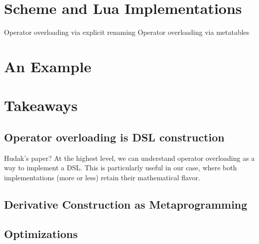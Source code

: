 \documentclass{article}
\begin{document}
\section{Scheme and Lua Implementations}
Operator overloading via explicit renaming
Operator overloading via metatables

\section{An Example}

\section{Takeaways}
\subsection{Operator overloading is DSL construction}
Hudak's paper?
At the highest level, we can understand operator overloading as a way to implement a DSL.  This is particularly useful in our case, where both implementations (more or less) retain their mathematical flavor.

\subsection{Derivative Construction as Metaprogramming}

\subsection{Optimizations}
\end{document}
